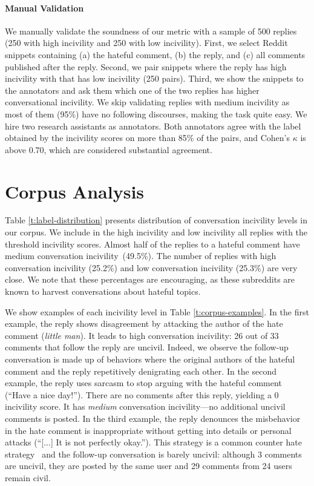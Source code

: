 \documentclass[11pt]{article}
\begin{document}
	
	
	\paragraph{Manual Validation}
	\label{ss:validation}
	We manually validate the soundness of our metric with a sample of 500 replies (250 with high incivility and 250 with low incivility).
	First, we select Reddit snippets containing 
	(a) the hateful comment,
	(b)	the reply,	and 
    (c) all comments published after the reply.
	Second, we pair snippets where the reply has high incivility with that has low incivility (250 pairs).
	Third, we show the snippets to the annotators
	and ask them which one of the two replies has higher conversational incivility.
	We skip validating replies with medium incivility as most of them (95\%) have no following discourses, making the task quite easy.
	We hire two research assistants as annotators.
	Both annotators agree with the label obtained by the incivility scores on more than 85\% of the pairs,
	and Cohen's $\kappa$ is above 0.70, which are considered substantial agreement.

	
	\section{Corpus Analysis} 
	\label{s:corpus_analysis}
	
	Table \ref{t:label-distribution} presents distribution of conversation incivility levels in our corpus.
	We include in the high incivility and low incivility all replies with the threshold incivility scores.
	Almost half of the replies to a hateful comment have medium conversation incivility~(49.5\%).
	The number of replies with high conversation incivility (25.2\%) and low conversation incivility (25.3\%) are very close.
	We note that these percentages are encouraging, as these subreddits are known to harvest conversations about hateful topics.
	
	We show examples of each incivility level in Table \ref{t:corpus-examples}. 
	In the first example,
	the reply shows disagreement by attacking the author of the hate comment (\emph{little man}).
	It leads to high conversation incivility: 26 out of 33 comments that follow the reply are uncivil.
	Indeed, we observe the follow-up conversation is made up of behaviors where the original authors of the hateful comment and the reply  repetitively denigrating each other.
	In the second example, the reply uses sarcasm to stop arguing with the hateful comment  (``Have a nice day!'').
	There are no comments after this reply, yielding a 0 incivility score.
	It has \emph{medium} conversation incivility---no additional uncivil comments is posted.
	In the third example, the reply denounces the misbehavior in the hate comment is inappropriate without getting into details or personal attacks (``[...] It is not perfectly okay.'').
	This strategy is a common counter hate strategy~\cite{DBLP:conf/icwsm/MathewSTRSMG019} and the follow-up conversation is barely uncivil: although 3 comments are uncivil, they are posted by the same user and 29 comments from 24 users remain civil.
	
\end{document}
